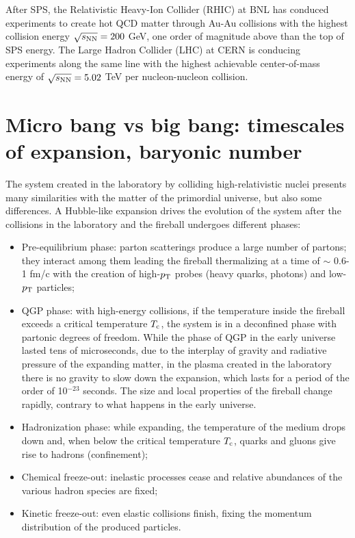 After SPS, the Relativistic Heavy-Ion Collider (RHIC) at BNL 
has conduced experiments to create hot QCD matter through Au-Au 
collisions with the highest collision energy $\sqrt{s_{\rm NN}} = 200$ GeV, 
one order of magnitude above than the top of SPS energy. 
The Large Hadron Collider (LHC) at CERN is conducing experiments 
along the same line with the highest achievable center-of-mass 
energy of $\sqrt{s_{\rm NN}} = 5.02$ TeV per nucleon-nucleon collision.

\section{Micro bang vs big bang: timescales of expansion, baryonic number}
The system created in the laboratory by colliding
high-relativistic nuclei presents many similarities with 
the matter of the primordial universe, but also some differences. 
A Hubble-like expansion drives the 
evolution of the system after the collisions in the laboratory and the fireball undergoes different phases: 
\begin{itemize}
\item Pre-equilibrium phase: parton scatterings produce a large number of partons; they interact among them leading the fireball thermalizing at a time of $\sim$ 0.6-1 fm/c with the creation of high-$p_{\rm T}$ probes (heavy quarks, photons) and low-$p_{\rm T}$ particles;
\item QGP phase: with high-energy collisions, if the temperature inside the fireball exceeds a critical temperature $T_{\rm c}$, the system is in a deconfined phase with partonic degrees of freedom. While the phase of QGP in the early universe lasted
tens of microseconds, due to the interplay of gravity and
radiative pressure of the expanding matter, in the plasma created in the laboratory 
there is no gravity to slow down the expansion, which lasts for a period of
the order of 10$^{-23}$ seconds. The size and local properties of
the fireball change rapidly, contrary to what happens in the 
early universe.

\item Hadronization phase: while expanding, the temperature of the medium drops down and, when below the critical temperature $T_{\rm c}$, quarks and gluons give rise to hadrons (confinement);
\item Chemical freeze-out: inelastic processes cease and relative abundances of the various hadron species are fixed;
\item Kinetic freeze-out: even elastic collisions finish, fixing the momentum distribution of the produced particles. 
\end{itemize} 

